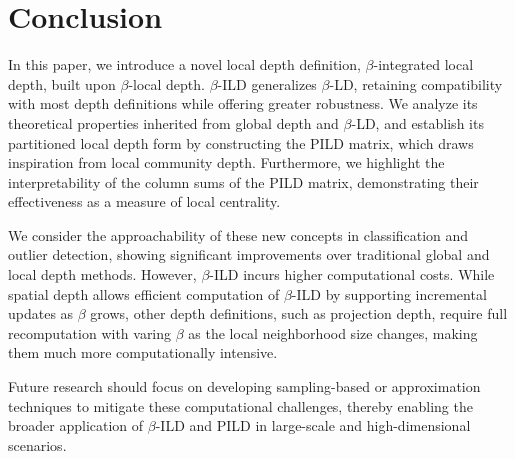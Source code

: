 \documentclass[final,3p,times]{elsarticle}
\begin{document}
\section{Conclusion} \label{sec:conclu}
In this paper, we introduce a novel local depth definition, $\beta$-integrated local depth, built upon $\beta$-local depth. $\beta$-ILD generalizes $\beta$-LD, retaining compatibility with most depth definitions while offering greater robustness. We analyze its theoretical properties inherited from global depth and $\beta$-LD, and establish its partitioned local depth form by constructing the PILD matrix, which draws inspiration from local community depth. Furthermore, we highlight the interpretability of the column sums of the PILD matrix, demonstrating their effectiveness as a measure of local centrality.

We consider the approachability of these new concepts in classification and outlier detection, showing significant improvements over traditional global and local depth methods. However, $\beta$-ILD incurs higher computational costs. While spatial depth allows efficient computation of $\beta$-ILD by supporting incremental updates as $\beta$ grows, other depth definitions, such as projection depth, require full recomputation with varing $\beta$ as the local neighborhood size changes, making them much more computationally intensive.

Future research should focus on developing sampling-based or approximation techniques to mitigate these computational challenges, thereby enabling the broader application of $\beta$-ILD and PILD in large-scale and high-dimensional scenarios.
\end{document}
